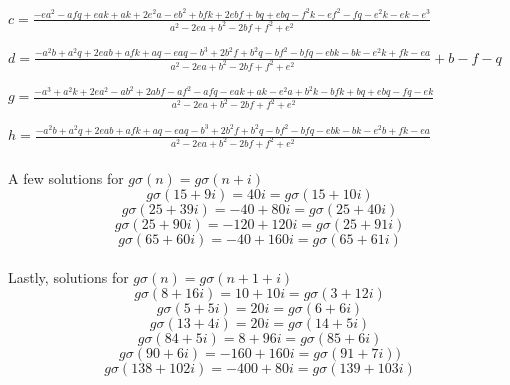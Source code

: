 \documentclass[12pt]{amsart}
\begin{document}
$c = \frac{-ea^2 -afq + eak + ak + 2e^2a -eb^2 + bfk + 2ebf + bq + ebq -f^2k -ef^2 -fq-e^2k -ek -e^3}{a^2-2ea+b^2-2bf+f^2+e^2}$

$d = \frac{-a^2b+a^2q+2eab+afk+aq-eaq-b^3+2b^2f+b^2q-bf^2-bfq-ebk-bk-e^2k+fk-ea}{a^2-2ea+b^2-2bf+f^2+e^2} +b -f -q$

$g =\frac{-a^3 + a^2k + 2ea^2-ab^2+2abf-af^2-afq-eak+ak-e^2a+b^2k-bfk+bq+ebq-fq-ek}{a^2-2ea+b^2-2bf+f^2+e^2}$

$h = \frac{-a^2b+a^2q+2eab+afk+aq-eaq-b^3+2b^2f+b^2q-bf^2-bfq-ebk-bk-e^2b+fk-ea}{a^2-2ea+b^2-2bf+f^2+e^2} $
\\
\\
A few solutions for $g\sigma(n) = g\sigma(n+i)$
\\
$$g\sigma(15 + 9i) = 40i = g\sigma(15 + 10i)$$
$$g\sigma(25 + 39i) = -40 + 80i  = g\sigma( 25 + 40i)$$
$$g\sigma(25 + 90i) = -120 + 120i  = g\sigma(25 + 91i)$$
$$g\sigma(65 + 60i) = -40 + 160i = g\sigma(65 + 61i)$$
\\
Lastly, solutions for $g\sigma(n) = g\sigma(n+1+i)$
\\
$$g\sigma(8 + 16i) = 10 + 10i = g\sigma(3 + 12i)$$
$$g\sigma(5 + 5i) = 20i = g\sigma(6 + 6i)$$
$$g\sigma(13 + 4i) = 20i = g\sigma(14 + 5i)$$
$$g\sigma(84 + 5i) = 8 + 96i  = g\sigma(85 + 6i)$$
$$g\sigma(90 + 6i) = -160 + 160i  = g\sigma(91 + 7i))$$
$$g\sigma(138 + 102i) = -400 + 80i = g\sigma(139 + 103i)$$
\end{document}
